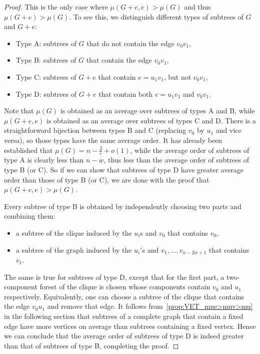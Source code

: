 \documentclass[11pt]{article}
\theoremstyle{definition}
\begin{document}
\begin{proof}
 This is the only case where $\mu(G+e,e)>\mu(G)$ and thus $\mu(G+e) > \mu(G)$. To see this, we distinguish different types of subtrees of $G$ and $G+e$:
 \begin{itemize}
    \item Type A: subtrees of $G$ that do not contain the edge $v_0v_1$,
    \item Type B: subtrees of $G$ that contain the edge $v_0v_1$,
    \item Type C: subtrees of $G+e$ that contain $e = u_1v_1$, but not $v_0v_1$,
    \item Type D: subtrees of $G+e$ that contain both $e = u_1v_1$ and $v_0v_1$.
 \end{itemize}
Note that $\mu(G)$ is obtained as an average over subtrees of types A and B, while $\mu(G+e,e)$ is obtained as an average over subtrees of types C and D. There is a straightforward bijection between types B and C (replacing $v_0$ by $u_1$ and vice versa), so those types have the same average order. It has already been established that $\mu(G) = n - \frac{2}{e} + o(1)$, while the average order of subtrees of type A is clearly less than $n-w$, thus less than the average order of subtrees of type B (or C). So if we can show that subtrees of type D have greater average order than those of type B (or C), we are done with the proof that $\mu(G+e,e)>\mu(G)$.

Every subtree of type B is obtained by independently choosing two parts and combining them:
\begin{itemize}
    \item a subtree of the clique induced by the $u_i$s and $v_0$ that contains $v_0$,
    \item a subtree of the graph induced by the $u_i'$s and $v_1,\ldots,v_{n-2w+1}$ that contains $v_1$.
\end{itemize}
The same is true for subtrees of type D, except that for the first part, a two-component forest of the clique is chosen whose components contain $v_0$ and $u_1$ respectively. Equivalently, one can choose a subtree of the clique that contains the edge $v_0u_1$ and remove that edge. It follows from~\cref{prop:VET_mue>muv>mu} in the following section that subtrees of a complete graph that contain a fixed edge have more vertices on average than subtrees containing a fixed vertex. Hence we can conclude that the average order of subtrees of type D is indeed greater than that of subtrees of type B, completing the proof. 
\end{proof}
\end{document}

